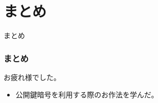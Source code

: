 \documentclass[12pt,dvipdfmx]{beamer}
\newcommand{\backupbegin}{
   \newcounter{framenumberappendix}
   \setcounter{framenumberappendix}{\value{framenumber}}
}
\newcommand{\backupend}{
   \addtocounter{framenumberappendix}{-\value{framenumber}}
   \addtocounter{framenumber}{\value{framenumberappendix}} 
}
\begin{document}
\begin{frame}
\end{frame}


\section{まとめ}
\begin{frame}
 \centering
 {\Large まとめ}
\end{frame}

\begin{frame}
\frametitle{まとめ}
お疲れ様でした。

\begin{itemize}
\item 公開鍵暗号を利用する際のお作法を学んだ。
\end{itemize}
\end{frame}






 


\end{document}
